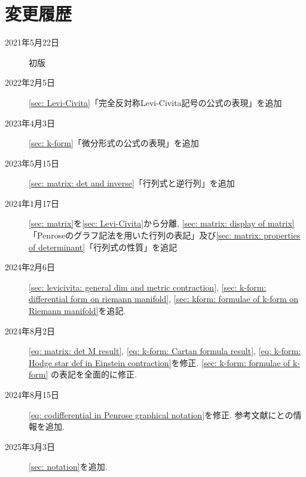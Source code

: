 \documentclass[dvipdfmx]{jsarticle}
\author{齊藤 巧磨}
\begin{document}
\maketitle






\section*{変更履歴}
\begin{description}
    \item[2021年5月22日] 初版
    \item[2022年2月5日] \ref{sec: Levi-Civita}「完全反対称Levi-Civita記号の公式の表現」を追加
    \item[2023年4月3日] \ref{sec: k-form}「微分形式の公式の表現」を追加
    \item[2023年5月15日] \ref{sec: matrix: det and inverse}「行列式と逆行列」を追加
    \item[2024年1月17日] \ref{sec: matrix}を\ref{sec: Levi-Civita}から分離, \ref{sec: matrix: display of matrix}「Penroseのグラフ記法を用いた行列の表記」及び\ref{sec: matrix: properties of determinant}「行列式の性質」を追記
    \item[2024年2月6日] \ref{sec: levicivita: general dim and metric contraction}, \ref{sec: k-form: differential form on riemann manifold}, \ref{sec: kform: formulae of k-form on Riemann manifold}を追記.
    \item[2024年8月2日] \eqref{eq: matrix: det M result}, \eqref{eq: k-form: Cartan formula result}, \eqref{eq: k-form: Hodge star def in Einstein contraction}を修正. \ref{sec: k-form: formulae of k-form} の表記を全面的に修正.
    \item[2024年8月15日] \eqref{eq: codifferential in Penrose graphical notation}を修正. 参考文献に\cite{Penrose and Rindler}と\cite{boosting}の情報を追加.
    \item[2025年3月3日] \ref{sec: notation}を追加.
\end{description}
\end{document}
